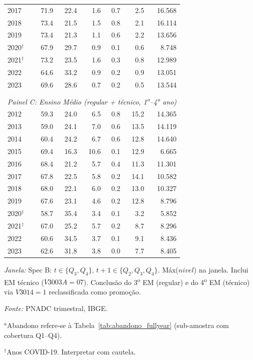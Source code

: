 \begin{table}[htbp]
\begin{threeparttable}
\begin{tabular}{lrrrrrr}
2017 & 71.9 & 22.4 & 1.6 & 0.7 & 2.5 & 16.568 \\
2018 & 73.4 & 21.5 & 1.5 & 0.8 & 2.1 & 16.114 \\
2019 & 73.4 & 21.3 & 1.1 & 0.6 & 2.2 & 13.656 \\
2020$^{\dagger}$ & 67.9 & 29.7 & 0.9 & 0.1 & 0.6 & 8.748 \\
2021$^{\dagger}$ & 73.2 & 23.5 & 1.6 & 0.3 & 0.8 & 12.989 \\
2022 & 64.6 & 33.2 & 0.9 & 0.2 & 0.9 & 13.051 \\
2023 & 69.6 & 28.6 & 0.7 & 0.2 & 0.5 & 13.544 \\
\\[0.3em]
\multicolumn{7}{l}{\textit{Painel C: Ensino M\'edio (regular + t\'ecnico, 1\textsuperscript{o}--4\textsuperscript{o} ano)}} \\
\midrule
2012 & 59.3 & 24.0 & 6.5 & 0.8 & 15.2 & 14.365 \\
2013 & 59.0 & 24.1 & 7.0 & 0.6 & 13.5 & 14.119 \\
2014 & 60.4 & 24.2 & 6.7 & 0.6 & 12.8 & 14.640 \\
2015 & 69.4 & 16.3 & 10.6 & 0.1 & 12.9 & 6.665 \\
2016 & 68.4 & 21.2 & 5.7 & 0.4 & 11.3 & 11.301 \\
2017 & 67.8 & 22.5 & 5.8 & 0.2 & 14.1 & 10.582 \\
2018 & 68.0 & 22.1 & 6.0 & 0.2 & 13.0 & 10.327 \\
2019 & 67.6 & 23.1 & 4.6 & 0.2 & 12.8 & 8.796 \\
2020$^{\dagger}$ & 58.7 & 35.4 & 3.4 & 0.1 & 3.2 & 5.852 \\
2021$^{\dagger}$ & 67.0 & 25.2 & 5.7 & 0.2 & 8.7 & 8.296 \\
2022 & 60.6 & 34.5 & 3.7 & 0.1 & 9.1 & 8.436 \\
2023 & 62.6 & 31.8 & 3.8 & 0.0 & 7.7 & 8.405 \\
\bottomrule
\end{tabular}
\begin{tablenotes}\footnotesize
\item \textit{Janela:} Spec B: $t \in \{Q_3, Q_4\}$, $t{+}1 \in \{Q_2, Q_3, Q_4\}$. M\'ax($nivel$) na janela. Inclui EM t\'ecnico ($V3003A=07$). Conclus\~ao do 3\textsuperscript{o} EM (regular) e do 4\textsuperscript{o} EM (t\'ecnico) via $V3014=1$ reclassificada como promo\c{c}\~ao.
\item \textit{Fonte:} PNADC trimestral, IBGE.
\item $^{a}$Abandono refere-se \`a Tabela~\ref{tab:abandono_fullyear} (sub-amostra com cobertura Q1--Q4).
\item $^{\dagger}$Anos COVID-19. Interpretar com cautela.
\end{tablenotes}
\end{threeparttable}
\end{table}
